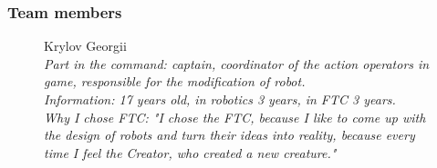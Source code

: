 \fillpage

\subsubsection{Team members}
\begin{figure}[H]
	\begin{minipage}[h]{0.47\linewidth}
	\end{minipage}
	\hfill
	\begin{minipage}[h]{0.47\linewidth}
		Krylov Georgii \\
		\emph{Part in the command: captain, coordinator of the action operators in game, responsible for the modification of robot.\\}
		\emph{Information: 17 years old, in robotics 3 years, in FTC 3 years. \\}
		\emph{Why I chose FTC: "I chose the FTC, because I like to come up with the design of robots and turn their ideas into reality, because every time I feel the Creator, who created a new creature."}		

\end{minipage}
\end{figure}
